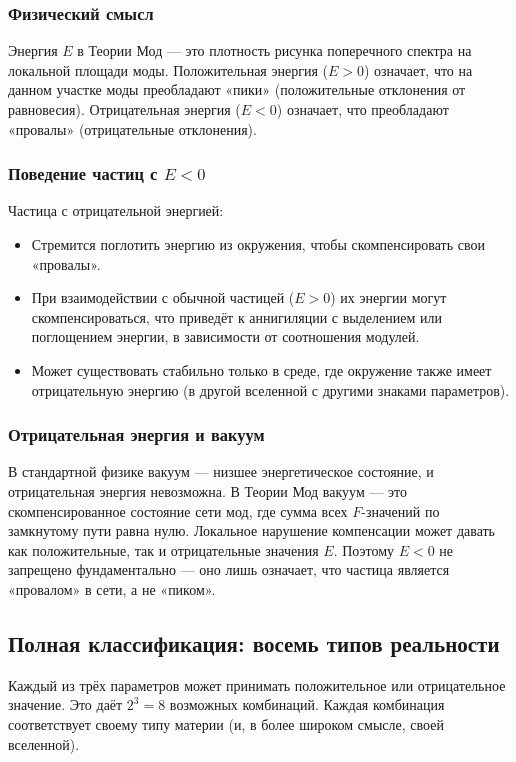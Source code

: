 \documentclass[12pt,a4paper]{article}
\begin{document}
\subsubsection{Физический смысл}
Энергия $E$ в Теории Мод --- это плотность рисунка поперечного спектра на локальной площади моды. Положительная энергия ($E > 0$) означает, что на данном участке моды преобладают «пики» (положительные отклонения от равновесия). Отрицательная энергия ($E < 0$) означает, что преобладают «провалы» (отрицательные отклонения).

\subsubsection{Поведение частиц с $E < 0$}
Частица с отрицательной энергией:
\begin{itemize}
    \item Стремится поглотить энергию из окружения, чтобы скомпенсировать свои «провалы».
    \item При взаимодействии с обычной частицей ($E > 0$) их энергии могут скомпенсироваться, что приведёт к аннигиляции с выделением или поглощением энергии, в зависимости от соотношения модулей.
    \item Может существовать стабильно только в среде, где окружение также имеет отрицательную энергию (в другой вселенной с другими знаками параметров).
\end{itemize}

\subsubsection{Отрицательная энергия и вакуум}
В стандартной физике вакуум --- низшее энергетическое состояние, и отрицательная энергия невозможна. В Теории Мод вакуум --- это скомпенсированное состояние сети мод, где сумма всех $F$-значений по замкнутому пути равна нулю. Локальное нарушение компенсации может давать как положительные, так и отрицательные значения $E$. Поэтому $E < 0$ не запрещено фундаментально --- оно лишь означает, что частица является «провалом» в сети, а не «пиком».

\subsection{Полная классификация: восемь типов реальности}
Каждый из трёх параметров может принимать положительное или отрицательное значение. Это даёт $2^3 = 8$ возможных комбинаций. Каждая комбинация соответствует своему типу материи (и, в более широком смысле, своей вселенной).
\end{document}
